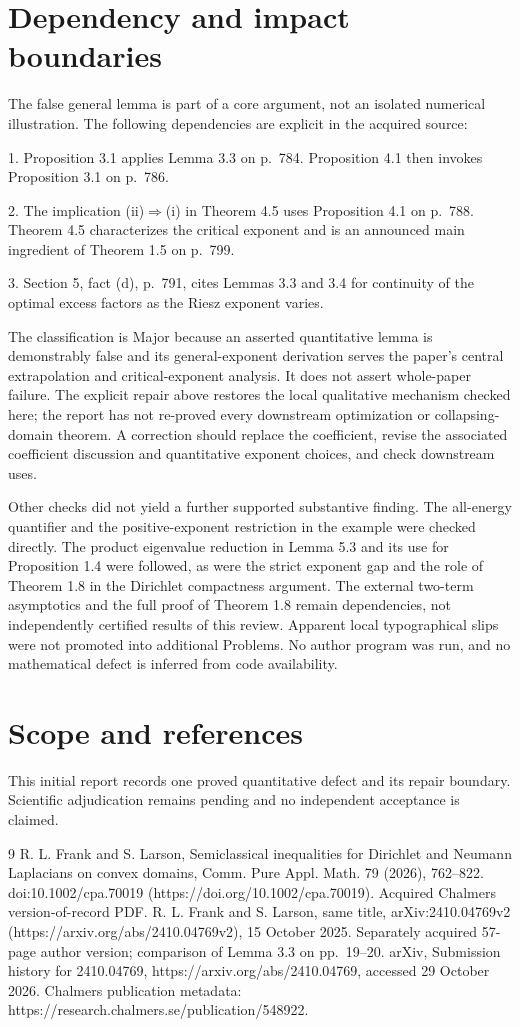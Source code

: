 \documentclass[10pt]{article}
\begin{document}
\section*{Dependency and impact boundaries}
The false general lemma is part of a core argument, not an isolated numerical illustration. The following dependencies are explicit in the acquired source:\par
1. Proposition 3.1 applies Lemma 3.3 on p. 784. Proposition 4.1 then invokes Proposition 3.1 on p. 786.\par
2. The implication (ii)\(\Rightarrow\)(i) in Theorem 4.5 uses Proposition 4.1 on p. 788. Theorem 4.5 characterizes the critical exponent and is an announced main ingredient of Theorem 1.5 on p. 799.\par
3. Section 5, fact (d), p. 791, cites Lemmas 3.3 and 3.4 for continuity of the optimal excess factors as the Riesz exponent varies.\par
The classification is Major because an asserted quantitative lemma is demonstrably false and its general-exponent derivation serves the paper’s central extrapolation and critical-exponent analysis. It does not assert whole-paper failure. The explicit repair above restores the local qualitative mechanism checked here; the report has not re-proved every downstream optimization or collapsing-domain theorem. A correction should replace the coefficient, revise the associated coefficient discussion and quantitative exponent choices, and check downstream uses.\par
Other checks did not yield a further supported substantive finding. The all-energy quantifier and the positive-exponent restriction in the example were checked directly. The product eigenvalue reduction in Lemma 5.3 and its use for Proposition 1.4 were followed, as were the strict exponent gap and the role of Theorem 1.8 in the Dirichlet compactness argument. The external two-term asymptotics and the full proof of Theorem 1.8 remain dependencies, not independently certified results of this review. Apparent local typographical slips were not promoted into additional Problems. No author program was run, and no mathematical defect is inferred from code availability.\par
\section*{Scope and references}
This initial report records one proved quantitative defect and its repair boundary. Scientific adjudication remains pending and no independent acceptance is claimed.\par
9 R. L. Frank and S. Larson, Semiclassical inequalities for Dirichlet and Neumann Laplacians on convex domains, Comm. Pure Appl. Math. 79 (2026), 762–822. doi:10.1002/cpa.70019 (https://doi.org/10.1002/cpa.70019). Acquired Chalmers version-of-record PDF. R. L. Frank and S. Larson, same title, arXiv:2410.04769v2 (https://arxiv.org/abs/2410.04769v2), 15 October 2025. Separately acquired 57-page author version; comparison of Lemma 3.3 on pp. 19–20. arXiv, Submission history for 2410.04769, https://arxiv.org/abs/2410.04769, accessed 29 October 2026. Chalmers publication metadata: https://research.chalmers.se/publication/548922.\par
\end{document}
